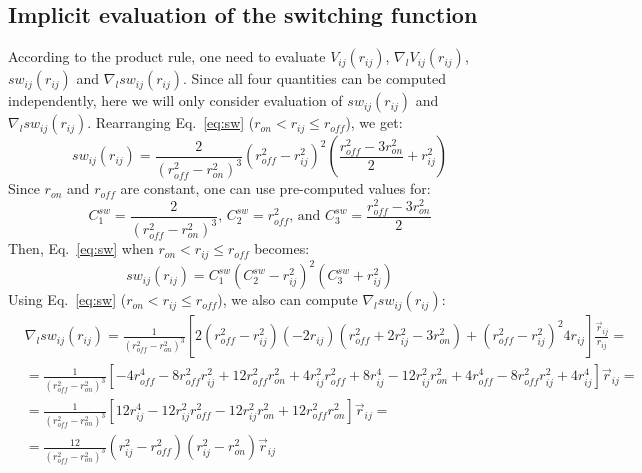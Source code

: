 \documentclass[11pt]{book}
\begin{document}

\subsection{Implicit evaluation of the switching function}

According to the product rule, one need to evaluate $V_{ij}(r_{ij})$, $\nabla_{l}V_{ij}(r_{ij})$, $sw_{ij}(r_{ij})$ and $\nabla_{l}sw_{ij}(r_{ij})$. Since all four quantities can be computed independently, here we will only consider evaluation of $sw_{ij}(r_{ij})$ and $\nabla_{l}sw_{ij}(r_{ij})$. Rearranging Eq.~\ref{eq:sw} ($r_{on}<r_{ij}\leq r_{off}$), we get:
\begin{equation}\label{eq:sw3}
sw_{ij}(r_{ij})= \frac{2}{{\left(r_{off}^{2}-r_{on}^{2}\right)^{3}}}\left(r_{off}^{2}-r_{ij}^{2}\right)^{2}\left(\frac{r_{off}^{2}-3r_{on}^{2}}{2}+r_{ij}^{2}\right)
\end{equation}
Since $r_{on}$ and $r_{off}$ are constant, one can use pre-computed values for:
\begin{equation}\label{eq:sw4}
C^{sw}_{1} = \frac{2}{\left(r_{off}^{2}-r_{on}^{2}\right)^{3}} \text{,  }
C^{sw}_{2} = r_{off}^{2} \text{, and  }
C^{sw}_{3} = \frac{r_{off}^{2}-3r_{on}^{2}}{2}
\end{equation}
Then, Eq.~\ref{eq:sw} when $r_{on}<r_{ij}\leq r_{off}$ becomes:
\begin{equation}\label{eq:sw5}
sw_{ij}(r_{ij})=C^{sw}_{1}\left(C^{sw}_{2}-r_{ij}^{2}\right)^{2}\left(C^{sw}_{3}+r_{ij}^{2}\right)
\end{equation}
Using Eq.~\ref{eq:sw} ($r_{on}<r_{ij}\leq r_{off}$), we also can compute $\nabla_{l}sw_{ij}(r_{ij})$:
\begin{equation}\label{eq:dsw1}
\begin{split}
&\nabla_{l}sw_{ij}(r_{ij}) = \frac{1}{\left(r_{off}^{2}-r_{on}^{2}\right)^{3}}\left[2\left(r_{off}^{2}-r_{ij}^{2}\right)\left(-2r_{ij}\right)\left(r_{off}^{2}+2r_{ij}^{2}-3r_{on}^{2}\right)+\left(r_{off}^{2}-r_{ij}^2\right)^{2}4r_{ij}\right]\frac{\vec{r}_{ij}}{r_{ij}} = \\
&= \frac{1}{\left(r_{off}^{2}-r_{on}^{2}\right)^{3}}\left[-4r_{off}^{4}-8r_{off}^{2}r_{ij}^{2}+12r_{off}^{2}r_{on}^{2}+4r_{ij}^{2}r_{off}^{2}+8r_{ij}^{4}-12r_{ij}^{2}r_{on}^{2}+4r_{off}^{4}-8r_{off}^{2}r_{ij}^{2}+4r_{ij}^{4}\right]\vec{r}_{ij} = \\
&= \frac{1}{\left(r_{off}^{2}-r_{on}^{2}\right)^{3}}\left[12r_{ij}^{4}-12r_{ij}^{2}r_{off}^{2}-12r_{ij}^{2}r_{on}^{2}+12r_{off}^{2}r_{on}^{2}\right]\vec{r}_{ij} = \\
&= \frac{12}{\left(r_{off}^{2}-r_{on}^{2}\right)^{3}}\left(r_{ij}^{2}-r_{off}^{2}\right)\left(r_{ij}^2-r_{on}^{2}\right)\vec{r}_{ij}\\
\end{split}
\end{equation}
\end{document}
